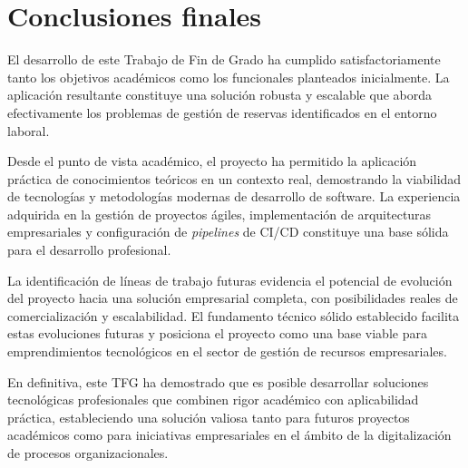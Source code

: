 \section{Conclusiones finales}\label{conclusiones-finales}
El desarrollo de este Trabajo de Fin de Grado ha cumplido satisfactoriamente tanto los objetivos académicos como los funcionales planteados inicialmente. La aplicación resultante constituye una solución robusta y escalable que aborda efectivamente los problemas de gestión de reservas identificados en el entorno laboral.

Desde el punto de vista académico, el proyecto ha permitido la aplicación práctica de conocimientos teóricos en un contexto real, demostrando la viabilidad de tecnologías y metodologías modernas de desarrollo de software. La experiencia adquirida en la gestión de proyectos ágiles, implementación de arquitecturas empresariales y configuración de \emph{pipelines} de CI/CD constituye una base sólida para el desarrollo profesional.

La identificación de líneas de trabajo futuras evidencia el potencial de evolución del proyecto hacia una solución empresarial completa, con posibilidades reales de comercialización y escalabilidad. El fundamento técnico sólido establecido facilita estas evoluciones futuras y posiciona el proyecto como una base viable para emprendimientos tecnológicos en el sector de gestión de recursos empresariales.

En definitiva, este TFG ha demostrado que es posible desarrollar soluciones tecnológicas profesionales que combinen rigor académico con aplicabilidad práctica, estableciendo una solución valiosa tanto para futuros proyectos académicos como para iniciativas empresariales en el ámbito de la digitalización de procesos organizacionales.
